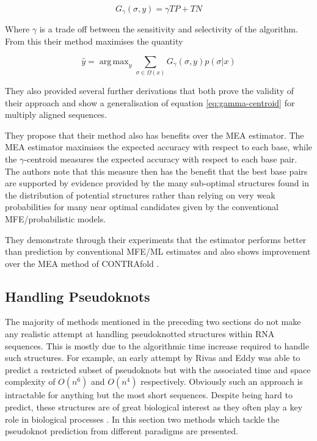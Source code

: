 \documentclass[journal]{IEEEtran}
\DeclareMathOperator*{\argmax}{arg\,max}
\begin{document}
\begin{equation}
	G_\gamma(\sigma, y) = \gamma TP + TN
\end{equation}

Where $\gamma$ is a trade off  between the sensitivity and selectivity of the algorithm. From this their method maximises the quantity

\begin{equation}
\label{eq:gamma-centroid}
	\hat{y} = \argmax_{y} \sum_{\sigma \in \Omega(x)} G_\gamma(\sigma, y) p(\sigma | x)
\end{equation}

They also provided several further derivations that both prove the validity of their approach and show a generalisation of equation \ref{eq:gamma-centroid} for multiply aligned sequences.

They propose that their method also has benefits over the MEA estimator. The MEA estimator maximises the expected accuracy with respect to each base, while the $\gamma$-centroid measures the expected accuracy with respect to each base pair. The authors note that this measure  then has the benefit that the best base pairs are supported by evidence provided by the many sub-optimal structures found in the distribution of potential structures rather than relying on very weak probabilities for many near optimal candidates given by the conventional MFE/probabilistic models. 

They demonstrate through their experiments that the estimator performs better than prediction by conventional MFE/ML estimates and also shows improvement over the MEA method of CONTRAfold \cite{do2006contrafold}.


\subsection{Handling Pseudoknots}
\label{subsec:secondary-pseudoknots}
The majority of methods mentioned in the preceding two sections do not make any realistic attempt at handling pseudoknotted structures within RNA sequences. This is mostly due to the algorithmic time increase required to handle such structures. For example, an early attempt by Rivas and Eddy \cite{rivas1999dynamic} was able to predict a restricted subset of pseudoknots but with the associated time and space complexity of $O(n^6)$ and $O(n^4)$ respectively. Obviously such an approach is intractable for anything but the most short sequences. Despite being hard to predict, these structures are of great biological interest as they often play a key role in biological processes \cite{chen2005functional, pleij1985new}. In this section two methods which tackle the pseudoknot prediction from different paradigms are presented.
\end{document}
